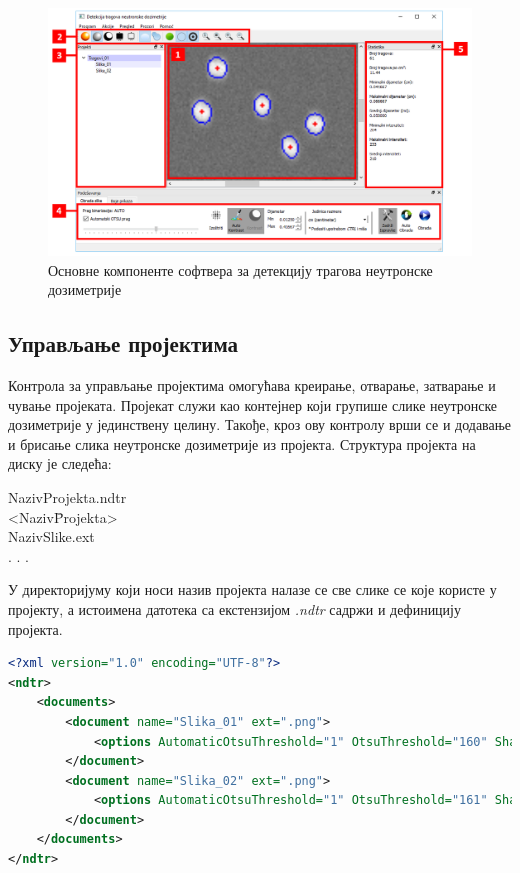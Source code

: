 \documentclass[11pt,a4paper,serbian,oneside]{book}
\begin{document}
\begin{figure}[H]
\begin{center}
\includegraphics[width=150mm]{images/softver2.png}
\end{center}
\caption{Основне компоненте софтвера за детекцију трагова неутронске дозиметрије}
\label{fig:softver2}
\end{figure}

\subsection{Управљање пројектима}

Контрола за управљање пројектима омогућава креирање, отварање, затварање и чување пројеката.
Пројекат служи као контејнер који групише слике неутронске дозиметрије у јединствену целину.
Такође, кроз ову контролу врши се и додавање и брисање слика неутронске дозиметрије из пројекта. Структура пројекта на диску је следећа:

\begin{tabbing}
NazivProjekta.ndtr \\
<Naziv\= Projekta>   \\
\>    NazivSlike.ext \\
\>    . . . \\
\end{tabbing}

У директоријуму који носи назив пројекта налазе се све слике се које користе у пројекту, а истоимена датотека са екстензијом \textit{.ndtr} садржи и дефиницију пројекта.

\begin{lstlisting}[language=Xml,label=lst:Project,caption=Пример дефиниције пројекта]
<?xml version="1.0" encoding="UTF-8"?>
<ndtr>
    <documents>
        <document name="Slika_01" ext=".png">
            <options AutomaticOtsuThreshold="1" OtsuThreshold="160" Sharpen="0" WoB="1" MinTraceDiameter="5" MaxTraceDiameter="40"/>
        </document>
        <document name="Slika_02" ext=".png">
            <options AutomaticOtsuThreshold="1" OtsuThreshold="161" Sharpen="0" WoB="1" MinTraceDiameter="5" MaxTraceDiameter="40"/>
        </document>
    </documents>
</ndtr>
\end{lstlisting}
\end{document}
